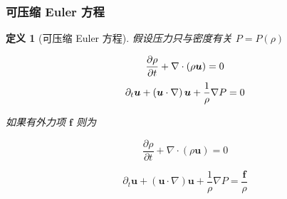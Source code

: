 \documentclass[aspectratio=2516]{beamer}
\newtheorem{defi}{\kaishu 定义}
\begin{document}
\begin{frame}
\frametitle{\kaishu 可压缩 Euler 方程}

\vspace{-0.25cm}

\begin{defi}[\kaishu 可压缩 Euler 方程]
	\kaishu 
	假设压力只与密度有关 $P = P\left( \rho  \right)$
	
	\begin{equation}
	\frac{{\partial \rho }}{{\partial t}}   + \nabla  \cdot \left( {\rho \boldsymbol{u}} \right)  = 0
	\notag 
	\end{equation}
	\vspace{-0.5cm}
	\begin{equation}
	{\partial _t}\boldsymbol{u} +  \left( {\boldsymbol{u} \cdot \nabla } \right)\boldsymbol{u} + \frac{1}{\rho }\nabla P  = 0
	\notag 
	\end{equation}
	
	如果有外力项 $ \boldsymbol{f} $ 则为
	
	\begin{equation}
	\frac{{\partial \rho }}{{\partial t}}   + \nabla  \cdot \left( {\rho \boldsymbol{u}} \right)  = 0
	\label{eq5.1.16}
	\end{equation}
	
	\begin{equation}
	{\partial _t}\boldsymbol{u} + \left( {\boldsymbol{u} \cdot \nabla } \right)\boldsymbol{u} + \frac{1}{\rho }\nabla P = \frac{\boldsymbol{f}}{\rho }
	\label{eq5.1.17}
	\end{equation}
\end{defi}
\end{frame}

\end{document}
